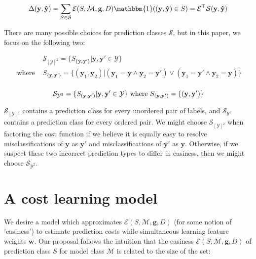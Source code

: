 \documentclass{article} %
\begin{document}
\begin{equation}
\Delta(\mathbf{y},\mathbf{\hat{y}})=\sum_{S\in\mathcal{S}}\mathcal{E}(S,\mathcal{M},\mathbf{g}, D)\mathbbm{1}((\mathbf{y},\mathbf{\hat{y}})\in S)=
\mathbf{\mathcal{E}}^\top \mathbf{\mathcal{S}}(\mathbf{y},\mathbf{\hat{y}})
\end{equation}

There are many possible choices for prediction classes $\mathcal{S}$, but
in this paper, we focus on the following two:

\begin{equation}
\begin{split}
& \mathcal{S}_{[\mathcal{Y}]^2} = \{ S_{\{\mathbf{y},\mathbf{y}'\}} | \mathbf{y},\mathbf{y}'\in\mathcal{Y}\} \\
\text{ where } & S_{\{\mathbf{y},\mathbf{y}'\}}=
\{ (\mathbf{y}_1, \mathbf{y}_2) | (\mathbf{y}_1=\mathbf{y}\wedge \mathbf{y}_2=\mathbf{y}')\vee(\mathbf{y}_1=\mathbf{y}'\wedge \mathbf{y}_2=\mathbf{y}) \} \\
\end{split}
\end{equation}

\begin{equation}
\mathcal{S}_{\mathcal{Y}^2} = \{ S_{(\mathbf{y},\mathbf{y}')} | \mathbf{y},\mathbf{y}'\in\mathcal{Y}\}\text{ where }S_{(\mathbf{y},\mathbf{y}')}=\{ (\mathbf{y},\mathbf{y}') \} \\
\end{equation}

$\mathcal{S}_{[\mathcal{Y}]^2}$ contains a prediction class for every
unordered pair of labels, and $\mathcal{S}_{\mathcal{Y}^2}$ contains
a prediction class for every ordered pair.  We might choose 
$\mathcal{S}_{[\mathcal{Y}]^2}$ when factoring the cost function if
we believe it is equally easy to resolve misclassifications of 
$\mathbf{y}$ as $\mathbf{y}'$ and misclassifications of $\mathbf{y}'$
as $\mathbf{y}$.  Otherwise, if we suspect these two incorrect 
prediction types to differ in easiness, then we might choose 
$\mathcal{S}_{\mathcal{Y}^2}$.

\section{A cost learning model}
\label{costLearningModel}

We desire a model which approximates 
$\mathcal{E}(S,\mathcal{M},\mathbf{g}, D)$ (for some notion of 
'easiness') to estimate prediction costs while simultaneous learning 
feature weights $\mathbf{w}$.   Our proposal follows the intuition 
that the easiness 
$\mathcal{E}(S,\mathcal{M},\mathbf{g},D)$ of prediction class $S$ for 
model class $\mathcal{M}$ is related to the size of the set:
\end{document}
